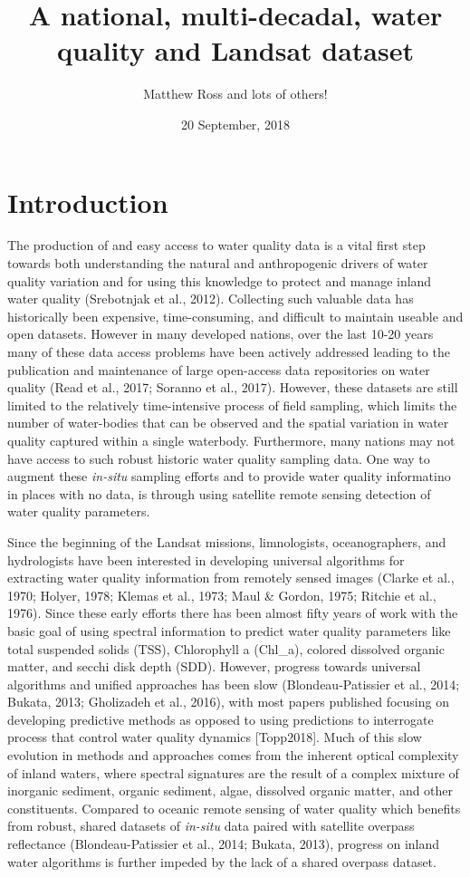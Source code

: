 \documentclass[]{article}
\title{A national, multi-decadal, water quality and Landsat dataset}
\author{Matthew Ross and lots of others!}
\date{20 September, 2018}
\begin{document}
\maketitle

{
\setcounter{tocdepth}{2}
\tableofcontents
}
\hypertarget{introduction}{%
\section{Introduction}\label{introduction}}

The production of and easy access to water quality data is a vital first
step towards both understanding the natural and anthropogenic drivers of
water quality variation and for using this knowledge to protect and
manage inland water quality (Srebotnjak et al., 2012). Collecting such
valuable data has historically been expensive, time-consuming, and
difficult to maintain useable and open datasets. However in many
developed nations, over the last 10-20 years many of these data access
problems have been actively addressed leading to the publication and
maintenance of large open-access data repositories on water quality
(Read et al., 2017; Soranno et al., 2017). However, these datasets are
still limited to the relatively time-intensive process of field
sampling, which limits the number of water-bodies that can be observed
and the spatial variation in water quality captured within a single
waterbody. Furthermore, many nations may not have access to such robust
historic water quality sampling data. One way to augment these
\emph{in-situ} sampling efforts and to provide water quality informatino
in places with no data, is through using satellite remote sensing
detection of water quality parameters.

Since the beginning of the Landsat missions, limnologists,
oceanographers, and hydrologists have been interested in developing
universal algorithms for extracting water quality information from
remotely sensed images (Clarke et al., 1970; Holyer, 1978; Klemas et
al., 1973; Maul \& Gordon, 1975; Ritchie et al., 1976). Since these
early efforts there has been almost fifty years of work with the basic
goal of using spectral information to predict water quality parameters
like total suspended solids (TSS), Chlorophyll a (Chl\_a), colored
dissolved organic matter, and secchi disk depth (SDD). However, progress
towards universal algorithms and unified approaches has been slow
(Blondeau-Patissier et al., 2014; Bukata, 2013; Gholizadeh et al.,
2016), with most papers published focusing on developing predictive
methods as opposed to using predictions to interrogate process that
control water quality dynamics {[}Topp2018{]}. Much of this slow
evolution in methods and approaches comes from the inherent optical
complexity of inland waters, where spectral signatures are the result of
a complex mixture of inorganic sediment, organic sediment, algae,
dissolved organic matter, and other constituents. Compared to oceanic
remote sensing of water quality which benefits from robust, shared
datasets of \emph{in-situ} data paired with satellite overpass
reflectance (Blondeau-Patissier et al., 2014; Bukata, 2013), progress on
inland water algorithms is further impeded by the lack of a shared
overpass dataset.
\end{document}
